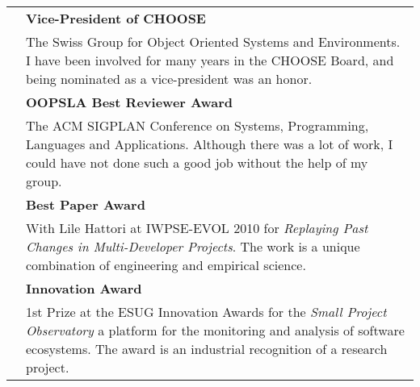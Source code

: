 
\newcommand {\award}[3]{\makebox[2cm][r]{\small #3} & {\bf #1} \\ & #2 \vspace{0.7em}\\}

\begin{tabular}{rp{10.5cm}}

	\award 
		{Vice-President of CHOOSE}
		{The Swiss Group for Object Oriented Systems and Environments. I have been involved for many years in the CHOOSE Board, and being nominated as a vice-president was an honor.}
		{2014 -- 2015}

	\award
		{OOPSLA Best Reviewer Award}
		{The ACM SIGPLAN Conference on Systems, Programming, Languages and Applications. Although there was a lot of work, I could have not done such a good job without the help of my group.}
		{2013}

	\award
		{Best Paper Award}
		{With Lile Hattori at IWPSE-EVOL 2010 for {\em Replaying Past Changes in Multi-Developer Projects}. The work is a unique combination of engineering and empirical science.}
		{2010}

	\award
		{Innovation Award}
		{1st Prize at the ESUG Innovation Awards for the {\em Small Project Observatory} a platform for the monitoring and analysis of software ecosystems. The award is an industrial recognition of a research project.}
		{2007}





\end{tabular}




%


